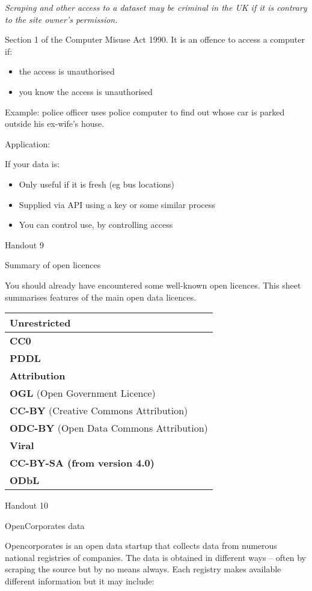 \documentclass{article}
\begin{document}
\emph{Scraping and other access to a dataset may be criminal in the UK
if it is contrary to the site owner's permission.}

Section 1 of the Computer Misuse Act 1990. It is an offence to access a
computer if:

\begin{itemize}
\item
  the access is unauthorised
\item
  you know the access is unauthorised
\end{itemize}

Example: police officer uses police computer to find out whose car is
parked outside his ex-wife's house.

Application:

If your data is:

\begin{itemize}
\item
  Only useful if it is fresh (eg bus locations)
\item
  Supplied via API using a key or some similar process
\item
  You can control use, by controlling access
\end{itemize}

Handout 9

Summary of open licences

You should already have encountered some well-known open licences. This
sheet summarises features of the main open data licences.

\begin{longtable}[c]{@{}l@{}}
\toprule
\textbf{Unrestricted}\tabularnewline
\midrule
\endhead
\textbf{CC0}\tabularnewline
\textbf{PDDL}\tabularnewline
\textbf{Attribution}\tabularnewline
\textbf{OGL} (Open Government Licence)\tabularnewline
\textbf{CC-BY} (Creative Commons Attribution)\tabularnewline
\textbf{ODC-BY} (Open Data Commons Attribution)\tabularnewline
\textbf{Viral}\tabularnewline
\textbf{CC-BY-SA (from version 4.0)}\tabularnewline
\textbf{ODbL}\tabularnewline
\bottomrule
\end{longtable}

Handout 10

OpenCorporates data

Opencorporates is an open data startup that collects data from numerous
national registries of companies. The data is obtained in different ways
-- often by scraping the source but by no means always. Each registry
makes available different information but it may include:
\end{document}
